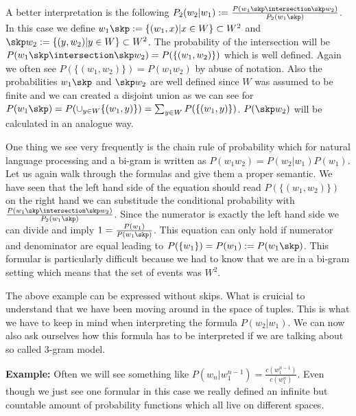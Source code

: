 A better interpretation is the following $P_2(w_2|w_1):=\frac{P(w_1\skp \intersection \skp w_2)}{P_2(w_1\skp)}$. 
In this case we define $w_1 \skp := \{(w_1,x)|x\in W\}\subset W^2$ and $\skp w_2 := \{(y,w_2)|y \in W\}\subset W^2$.
The probability of the intersection will be $P(w_1\skp \intersection \skp w_2) = P(\{(w_1,w_2)\})$ which is well defined.
Again we often see $P(\{(w_1,w_2)\}) = P(w_1w_2)$ by abuse of notation. 
Also the probabilities $w_1 \skp$ and $\skp w_2$ are well defined since $W$ was assumed to be finite and we can created a disjoint union  as we can see for $P(w_1 \skp) = P(\cup_{y\in W}\{(w_1,y)\}) = \sum_{y\in W}P(\{(w_1, y)\})$. $P(\skp w_2)$ will be calculated in an analogue way.

One thing we see very frequently is the chain rule of probability which for natural language processing and a bi-gram is written as $P(w_1w_2)=P(w_2|w_1)P(w_1)$.
Let us again walk through the formulas and give them a proper semantic.
We have seen that the left hand side of the equation should read $P(\{(w_1,w_2)\})$ on the right hand we can substitude the conditional probability with $\frac{P(w_1\skp \intersection \skp w_2)}{P_2(w_1\skp)}$. 
Since the numerator is exactly the left hand side we can divide and imply $1=\frac{P(w_1)}{P(w_1\skp)}$. 
This equation can only hold if numerator and denominator are equal leading to $P(\{w_1\})=P(w_1):=P(w_1\skp)$.
This formular is particularly difficult because we had to know that we are in a bi-gram setting which means that the set of events was $W^2$.

The above example can be expressed without skips. What is cruicial to understand that we have been moving around in the space of tuples. 
This is what we have to keep in mind when interpreting the formula $P(w_2|w_1)$. 
We can now also ask ourselves how this formula has to be interpreted if we are talking about so called $3$-gram model. 

\textbf{Example:} Often we will see something like $P(w_n|w_1^{n-1})=\frac{c(w_1^{n-1})}{c(w_1^n)}$.
Even though we just see one formular in this case we really defined an infinite but countable amount of probability functions which all live on different spaces. 


